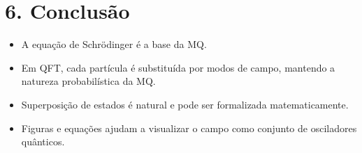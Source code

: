 \documentclass[12pt,a4paper]{article}
\begin{document}
\section*{6. Conclusão}

\begin{itemize}
    \item A equação de Schrödinger é a base da MQ.
    \item Em QFT, cada partícula é substituída por modos de campo, mantendo a natureza probabilística da MQ.
    \item Superposição de estados é natural e pode ser formalizada matematicamente.
    \item Figuras e equações ajudam a visualizar o campo como conjunto de osciladores quânticos.
\end{itemize}
\end{document}
